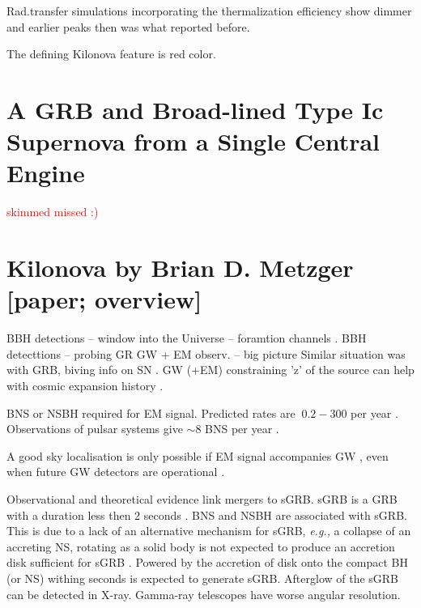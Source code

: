 \documentclass[11pt,a4paper,headinclude=true,DIV=14,BCOR=8mm,chapterprefix,listof=totoc,twoside,openright,abstracton]{scrbook}
\newcommand{\red}[1]{\textcolor{red}{#1}}
\begin{document}
Rad.transfer simulations incorporating the thermalization efficiency show dimmer and earlier peaks then was what reported before.

The defining Kilonova feature is red color. 


\section{A GRB and Broad-lined Type Ic Supernova from a Single Central Engine}
\red{skimmed}
\red{missed :) }



\section{Kilonova by Brian D. Metzger [paper; overview]}

BBH detections -- window into the Universe -- foramtion channels \cite{(Abbott and et al. 2016c)}.
BBH detecttions -- probing GR \cite{(Miller 2016)}
GW + EM observ. -- big picture \cite{(Bloom et al 2009)}
Similar situation was with GRB, biving info on SN \cite{(Fruchter et al 2006; Fong and Berger 2013)}.
GW (+EM) constraining 'z' of the source can help with cosmic expansion history \cite{(Holz and Hughes 2005; Nissanke et al 2013)}. 

BNS or NSBH required for EM signal. Predicted rates are $~0.2 - 300$ per year \cite{(Abadie and et al. 2010; Dominik et al 2015)}. Observations of pulsar systems give $\sim 8 $ BNS per year \cite{(Kalogera et al 2004; Kim et al 2015)}. 

A good sky localisation is only possible if EM signal accompanies GW \cite{Abbott and et al. 2016b,a}, even when future GW detectors are operational \cite{(Fairhurst 2011; Nissanke et al 2013; Rodriguez et al 2014).(Somiya 2012)}.

Observational \cite{(Fong et al 2014b)} and theoretical \cite{(Eichler et al 1989; Narayan et al 1992)} evidence link mergers to sGRB. 
sGRB is a GRB with a duration less then 2 seconds \cite{Nakar 2007; Berger 2014)}.
BNS and NSBH are associated with sGRB. This is due to a lack of an alternative mechanism for sGRB, \textit{e.g.,} a collapse of an accreting NS, rotating as a solid body is not expected to produce an accretion disk sufficient for sGRB \cite{Margalit et al (2015),Shibata (2003)}. 
Powered by the accretion of disk onto the compact BH (or NS) withing seconds is expected to generate sGRB.
Afterglow of the sGRB can be detected in X-ray. Gamma-ray telescopes have worse angular resolution. 
\end{document}

